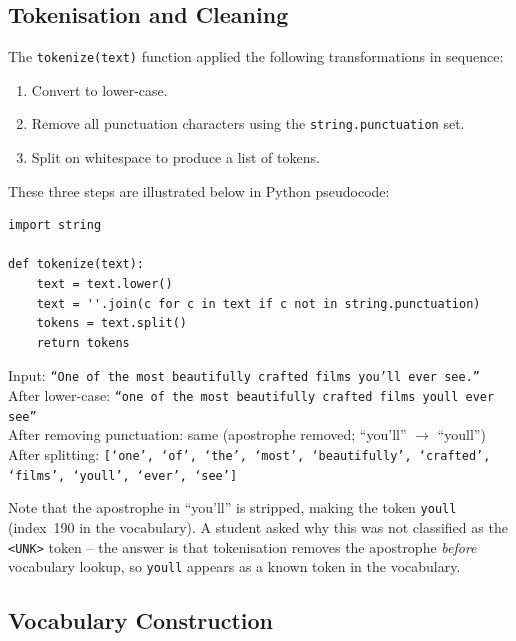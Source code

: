 \documentclass[12pt,a4paper]{article}
\begin{document}
\subsection{Tokenisation and Cleaning}
\label{subsec:tokenisation}

The \texttt{tokenize(text)} function applied the following
transformations in sequence:

\begin{enumerate}[label=\arabic*.]
  \item Convert to lower-case.
  \item Remove all punctuation characters using the \texttt{string.punctuation} set.
  \item Split on whitespace to produce a list of tokens.
\end{enumerate}

These three steps are illustrated below in Python pseudocode:

\begin{verbatim}
import string

def tokenize(text):
    text = text.lower()
    text = ''.join(c for c in text if c not in string.punctuation)
    tokens = text.split()
    return tokens
\end{verbatim}

\begin{example}[title=Tokenisation in Action]
  Input: \texttt{``One of the most beautifully crafted films you'll ever see.''}\\[4pt]
  After lower-case: \texttt{``one of the most beautifully crafted films youll ever see''}\\[4pt]
  After removing punctuation: same (apostrophe removed; ``you'll'' $\to$ ``youll'')\\[4pt]
  After splitting: \texttt{[`one', `of', `the', `most', `beautifully', `crafted', `films', `youll', `ever', `see']}
\end{example}

Note that the apostrophe in ``you'll'' is stripped, making the
token \texttt{youll} (index~190 in the vocabulary).  A student asked
why this was not classified as the \texttt{<UNK>} token -- the answer
is that tokenisation removes the apostrophe \emph{before} vocabulary
lookup, so \texttt{youll} appears as a known token in the vocabulary.

\subsection{Vocabulary Construction}
\label{subsec:vocabulary}
\end{document}
